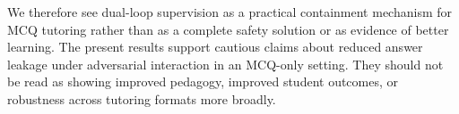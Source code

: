 \documentclass[sigconf,review,anonymous]{acmart}
\begin{document}
We therefore see dual-loop supervision as a practical containment mechanism for MCQ tutoring rather than as a complete safety solution or as evidence of better learning. The present results support cautious claims about reduced answer leakage under adversarial interaction in an MCQ-only setting. They should not be read as showing improved pedagogy, improved student outcomes, or robustness across tutoring formats more broadly.
\end{document}
